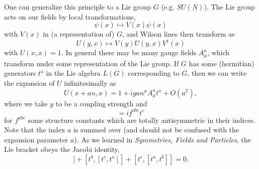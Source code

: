 One can generalize this principle to a Lie group $G$ (e.g. $SU(N)$). The Lie group acts on our fields by local transformations,
\begin{equation}
    \psi(x) \mapsto V(x) \psi(x)
\end{equation}
with $V(x)$ in (a representation of) $G$, and Wilson lines then transform as
\begin{equation}
    U(y,x)\mapsto V(y) U(y,x) V^\dagger (x)
\end{equation}
with $U(x,x)=1$. In general there may be many gauge fields $A^a_\mu$, which transform under some representation of the Lie group. If $G$ has some (hermitian) generators $t^a$ in the Lie algebra $L(G)$ corresponding to $G$, then we can write the expansion of $U$ infinitesimally as
\begin{equation}
    U(x+an,x)=1+ig a n^\mu A_\mu^a t^a+O(a^2),
\end{equation}
where we take $g$ to be a coupling strength and
\begin{equation}
    [t^a,t^b] = if^{abc}t^c
\end{equation}
for $f^{abc}$ some structure constants which are totally antisymmetric in their indices. Note that the index $a$ is summed over (and should not be confused with the expansion parameter $a$). As we learned in \emph{Symmetries, Fields and Particles}, the Lie bracket obeys the Jacobi identity,
\begin{equation*}
    [t^a,[t^b,t^c]]+[t^b,[t^c,t^a]] +[t^c,[t^a,t^b]]=0.
\end{equation*}

